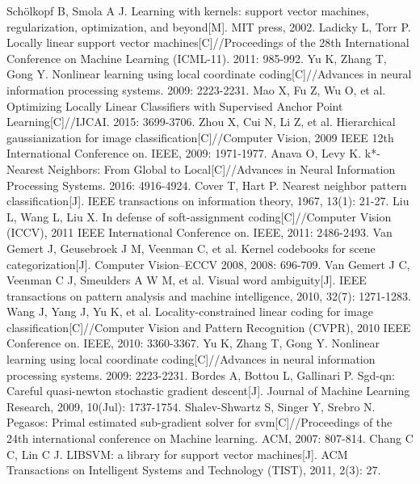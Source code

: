 \documentclass{llncs}
\begin{document}
	\begin{thebibliography}{1}
		Schölkopf B, Smola A J. Learning with kernels: support vector machines, regularization, optimization, and beyond[M]. MIT press, 2002.
		Ladicky L, Torr P. Locally linear support vector machines[C]//Proceedings of the 28th International Conference on Machine Learning (ICML-11). 2011: 985-992.
		Yu K, Zhang T, Gong Y. Nonlinear learning using local coordinate coding[C]//Advances in neural information processing systems. 2009: 2223-2231.
		Mao X, Fu Z, Wu O, et al. Optimizing Locally Linear Classifiers with Supervised Anchor Point Learning[C]//IJCAI. 2015: 3699-3706.
		Zhou X, Cui N, Li Z, et al. Hierarchical gaussianization for image classification[C]//Computer Vision, 2009 IEEE 12th International Conference on. IEEE, 2009: 1971-1977.
		Anava O, Levy K. k*-Nearest Neighbors: From Global to Local[C]//Advances in Neural Information Processing Systems. 2016: 4916-4924.
		Cover T, Hart P. Nearest neighbor pattern classification[J]. IEEE transactions on information theory, 1967, 13(1): 21-27.
		Liu L, Wang L, Liu X. In defense of soft-assignment coding[C]//Computer Vision (ICCV), 2011 IEEE International Conference on. IEEE, 2011: 2486-2493.
		Van Gemert J, Geusebroek J M, Veenman C, et al. Kernel codebooks for scene categorization[J]. Computer Vision–ECCV 2008, 2008: 696-709.
		Van Gemert J C, Veenman C J, Smeulders A W M, et al. Visual word ambiguity[J]. IEEE transactions on pattern analysis and machine intelligence, 2010, 32(7): 1271-1283.
		Wang J, Yang J, Yu K, et al. Locality-constrained linear coding for image classification[C]//Computer Vision and Pattern Recognition (CVPR), 2010 IEEE Conference on. IEEE, 2010: 3360-3367.
		Yu K, Zhang T, Gong Y. Nonlinear learning using local coordinate coding[C]//Advances in neural information processing systems. 2009: 2223-2231.
		Bordes A, Bottou L, Gallinari P. Sgd-qn: Careful quasi-newton stochastic gradient descent[J]. Journal of Machine Learning Research, 2009, 10(Jul): 1737-1754.
		Shalev-Shwartz S, Singer Y, Srebro N. Pegasos: Primal estimated sub-gradient solver for svm[C]//Proceedings of the 24th international conference on Machine learning. ACM, 2007: 807-814.
		Chang C C, Lin C J. LIBSVM: a library for support vector machines[J]. ACM Transactions on Intelligent Systems and Technology (TIST), 2011, 2(3): 27.
	\end{thebibliography}
\end{document}
